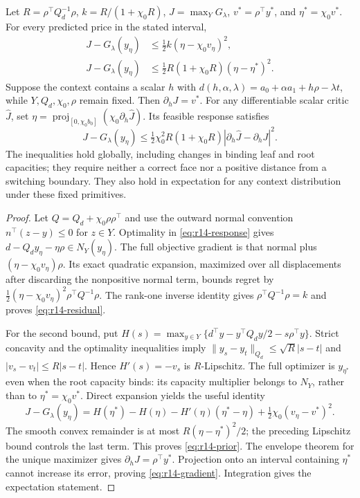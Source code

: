 \begin{theorem}\label{thm:r14-gradient}
Let $R=\rho^\top Q_d^{-1}\rho$, $k=R/(1+\chi_0R)$, $J=\max_YG_\lambda$, $v^*=\rho^\top y^*$, and $\eta^*=\chi_0v^*$. For every predicted price in the stated interval,
\begin{align}
 J-G_\lambda(y_\eta)&\leq \tfrac12 k(\eta-\chi_0v_\eta)^2,\label{eq:r14-residual}\\
 J-G_\lambda(y_\eta)&\leq \tfrac12 R(1+\chi_0R)(\eta-\eta^*)^2.\label{eq:r14-prior}
\end{align}
Suppose the context contains a scalar $h$ with $d(h,\alpha,\lambda)=a_0+\alpha a_1+h\rho-\lambda t$, while $Y,Q_d,\chi_0,\rho$ remain fixed. Then $\partial_hJ=v^*$. For any differentiable scalar critic $\widehat J$, set
$\eta=\operatorname{proj}_{[0,\chi_0b_0]}(\chi_0\partial_h\widehat J)$. Its feasible response satisfies
\begin{equation}\label{eq:r14-gradient}
 J-G_\lambda(y_\eta)\leq
 \tfrac12\chi_0^2R(1+\chi_0R)|\partial_h\widehat J-\partial_hJ|^2.
\end{equation}
The inequalities hold globally, including changes in binding leaf and root capacities; they require neither a correct face nor a positive distance from a switching boundary. They also hold in expectation for any context distribution under these fixed primitives.
\end{theorem}
\begin{proof}
Let $Q=Q_d+\chi_0\rho\rho^\top$ and use the outward normal convention $n^\top(z-y)\leq0$ for $z\in Y$. Optimality in \eqref{eq:r14-response} gives $d-Q_dy_\eta-\eta\rho\in N_Y(y_\eta)$. The full objective gradient is that normal plus $(\eta-\chi_0v_\eta)\rho$. Its exact quadratic expansion, maximized over all displacements after discarding the nonpositive normal term, bounds regret by
$\tfrac12(\eta-\chi_0v_\eta)^2\rho^\top Q^{-1}\rho$.
The rank-one inverse identity gives $\rho^\top Q^{-1}\rho=k$ and proves \eqref{eq:r14-residual}.

For the second bound, put $H(s)=\max_{y\in Y}\{d^\top y-y^\top Q_dy/2-s\rho^\top y\}$. Strict concavity and the optimality inequalities imply
$\|y_s-y_t\|_{Q_d}\leq\sqrt R|s-t|$ and $|v_s-v_t|\leq R|s-t|$. Hence $H'(s)=-v_s$ is $R$-Lipschitz. The full optimizer is $y_{\eta^*}$ even when the root capacity binds: its capacity multiplier belongs to $N_Y$, rather than to $\eta^*=\chi_0v^*$. Direct expansion yields the useful identity
\[
 J-G_\lambda(y_\eta)=H(\eta^*)-H(\eta)-H'(\eta)(\eta^*-\eta)
                  +\tfrac12\chi_0(v_\eta-v^*)^2.
\]
The smooth convex remainder is at most $R(\eta-\eta^*)^2/2$; the preceding Lipschitz bound controls the last term. This proves \eqref{eq:r14-prior}. The envelope theorem for the unique maximizer gives $\partial_hJ=\rho^\top y^*$. Projection onto an interval containing $\eta^*$ cannot increase its error, proving \eqref{eq:r14-gradient}. Integration gives the expectation statement.
\end{proof}

